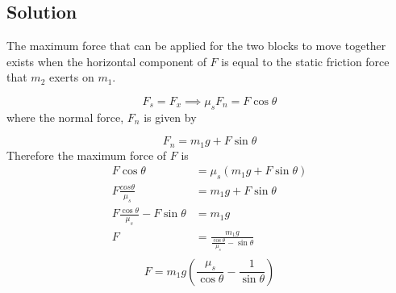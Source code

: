 \documentclass{article}
\begin{document}
\subsection*{Solution}
The maximum force that can be applied for the two blocks to move together exists when the horizontal component of $F$ is equal to the static friction force that $m_2$ exerts on $m_1$.

\[
	F_s = F_x \implies \mu_s F_n = F\cos\theta
\]
where the normal force, $F_n$ is given by

\[
	F_n = m_1g + F\sin\theta
\]
Therefore the maximum force of $F$ is
\begin{align*}
	F\cos\theta &= \mu_s\left( m_1g + F\sin\theta \right) \\
	F\frac{cos\theta}{\mu_s} &= m_1g + F\sin\theta \\
	F\frac{\cos\theta}{\mu_s} - F\sin\theta &= m_1g \\
	F &= \frac{m_1g}{\frac{\cos\theta}{\mu_s} - \sin\theta} \\
\end{align*}
\[
	\boxed{F = m_1g \left(\frac{\mu_s}{\cos\theta} - \frac{1}{\sin\theta}\right)}
\]
\end{document}
